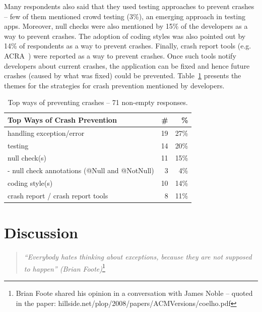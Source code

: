 Many respondents also said that they used testing approaches to prevent crashes -- few of them mentioned crowd testing (3\%), an emerging approach in testing apps. Moreover, null checks were also mentioned by 15\% of the developers as a way to prevent crashes. 
The adoption of coding styles was also pointed out by 14\% of respondents as a way to prevent crashes. Finally, crash report tools (e.g. ACRA~\cite{Acra14}) were reported as a way to prevent crashes. Once such tools notify developers about current crashes, the application can be fixed and hence future crashes (caused by what was fixed) could be prevented. Table~\ref{tab:topprevent} presents the themes for the strategies for crash prevention mentioned by developers.	 					
		
\bigskip 


\bigskip 
				
\begin{table}
\scriptsize
\centering
\begin{tabular}{lrr}
\hline
\bfseries{Top Ways of Crash Prevention} & \bfseries{\#} & \bfseries{\%} \\
\hline
handling exception/error  & 19 &	27\% \\
testing &	14 &	20\% \\
null check(s) &	11 &	15\% \\
- null check annotations (@Null and @NotNull)	& 3 & 	4\% \\
coding style(s)	& 10 &	14\% \\
crash report / crash report tools &	8	& 11\% \\
\hline
\end{tabular}
\caption{Top ways of preventing crashes -- 71 non-empty responses. }
\label{tab:topprevent}
\end{table}

\bigskip 

\section{Discussion}
\label{sec:disc}

\begin{quotation}
\noindent
 \emph{``Everybody hates thinking about exceptions, because they are not supposed to happen'' 
  (Brian Foote)}\footnote{Brian Foote shared his opinion in a conversation with James Noble -- quoted in the paper: hillside.net/plop/2008/papers/ACMVersions/coelho.pdf}
\end{quotation}


